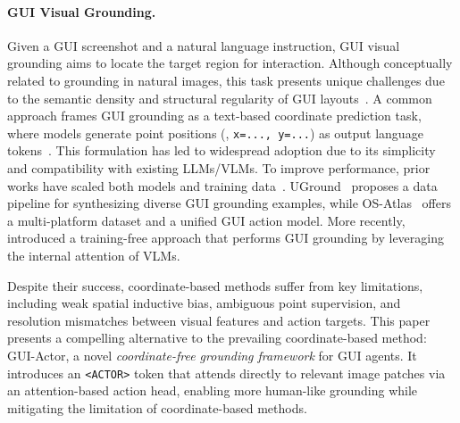 \paragraph{GUI Visual Grounding.}
Given a GUI screenshot and a natural language instruction, GUI visual grounding aims to locate the target region for interaction. 
Although conceptually related to grounding in natural images, this task presents unique challenges due to the semantic density and structural regularity of GUI layouts~\citep{cheng2024seeclick, gou2024navigating}. A common approach frames GUI grounding as a text-based coordinate prediction task, where models generate point positions (\eg, \texttt{x=..., y=...}) as output language tokens~\citep{chen2023shikra, wang2024qwen2}. This formulation has led to widespread adoption due to its simplicity and compatibility with existing LLMs/VLMs. To improve performance, prior works have scaled both models and training data~\citep{lin2024showui, yang2024aria, pawlowski2024tinyclick, tang2025think, bai2025qwen2, qin2025ui, xie2025scaling}. UGround~\citep{gou2024navigating} proposes a data pipeline for synthesizing diverse GUI grounding examples, while OS-Atlas~\citep{wu2024atlas} offers a multi-platform dataset and a unified GUI action model. More recently, \citet{xu2025attention} introduced a training-free approach that performs GUI grounding by leveraging the internal attention of VLMs.

Despite their success, coordinate-based methods suffer from key limitations,
including weak spatial inductive bias, ambiguous point supervision, and resolution mismatches between visual features and action targets.
This paper presents a compelling alternative to the prevailing coordinate-based method: GUI-Actor, a novel \textit{coordinate-free grounding framework} for GUI agents.
It introduces an \texttt{<ACTOR>} token that attends directly to relevant image patches via an attention-based action head, enabling more human-like grounding while mitigating the limitation of coordinate-based methods.




